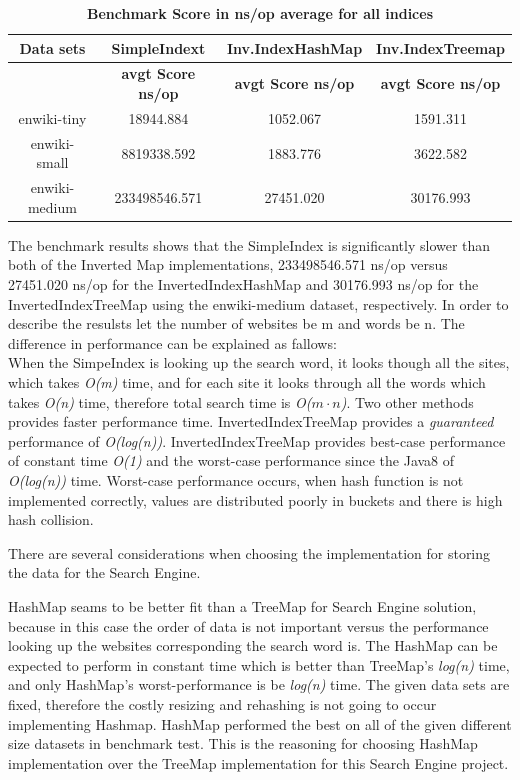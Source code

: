 \begin{table}[!htbp]
    \caption{\textbf{Benchmark Score in ns/op average for all indices}}
    \begin{tabular}{|c|c|c|c|}
        \hline
        \textbf{Data sets} & \textbf{SimpleIndext} & \textbf{Inv.IndexHashMap} & \textbf{Inv.IndexTreemap} \\ \hline
        \textbf{} & \textbf{avgt Score ns/op} & \textbf{avgt Score ns/op} & \textbf{avgt Score ns/op} \\ \hline
        enwiki-tiny &18944.884&1052.067&1591.311 \\ \hline
        enwiki-small &8819338.592&1883.776&3622.582\\ \hline
        enwiki-medium &233498546.571&27451.020&30176.993 \\ \hline
    \end{tabular}
    \label{table:result}
\end{table}


The benchmark results shows that the SimpleIndex is significantly slower than both of the Inverted Map implementations, 233498546.571 ns/op versus 27451.020 ns/op for the InvertedIndexHashMap and 30176.993 ns/op for the InvertedIndexTreeMap using the enwiki-medium dataset, respectively.
In order to describe the resulsts let the number of websites be m and words be n.
The difference in performance can be explained as fallows: \\
When the SimpeIndex is looking up the search word, it looks though all the sites, which takes \textit{O(m)} time, and for each site it looks through all the words which takes \textit{O(n)} time, therefore total search time is \textit{O($m\cdot n$)}. Two other methods provides faster performance time. InvertedIndexTreeMap provides a  \textit{guaranteed} performance of \textit{O(log(n))}. InvertedIndexTreeMap provides best-case performance of constant time \textit{O(1)} and the worst-case performance since the Java8 of \textit{O(log(n))} time. Worst-case performance occurs, when hash function is not implemented correctly, values are distributed poorly in buckets and there is high hash collision.

There are several considerations when choosing the implementation for storing the data for the Search Engine.

HashMap seams to be better fit than a TreeMap for Search Engine solution, because in this case the order of data is not important versus the performance looking up the websites corresponding the search word is. The HashMap can be expected to perform in constant time which is better than TreeMap's \textit{log(n)} time, and only HashMap's worst-performance is be \textit{log(n)} time. The given data sets are fixed, therefore the costly resizing and rehashing is not going to occur implementing Hashmap. HashMap performed the best on all of the given different size datasets in benchmark test. This is the reasoning for choosing HashMap implementation over the TreeMap implementation for this Search Engine project.




